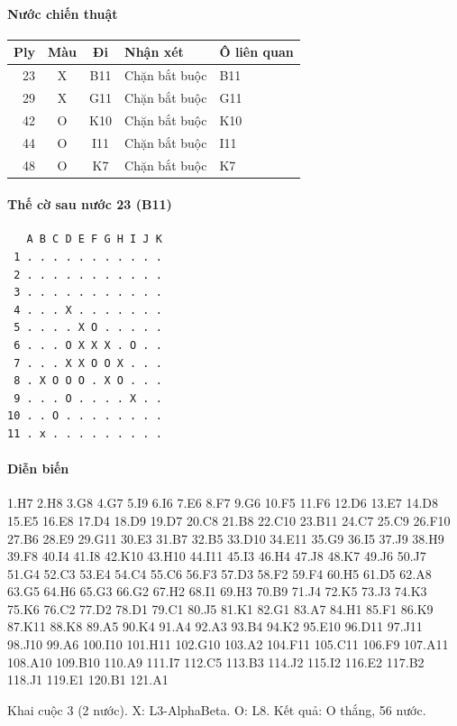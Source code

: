 \paragraph{Nước chiến thuật}
\begin{center}\small
\begin{tabular}{@{}rccll@{}}
\toprule
Ply & Màu & Đi & Nhận xét & Ô liên quan \\
\midrule
23 & X & B11 & Chặn bắt buộc & B11 \\
29 & X & G11 & Chặn bắt buộc & G11 \\
42 & O & K10 & Chặn bắt buộc & K10 \\
44 & O & I11 & Chặn bắt buộc & I11 \\
48 & O & K7 & Chặn bắt buộc & K7 \\
\bottomrule
\end{tabular}
\end{center}
\paragraph{Thế cờ sau nước 23 (B11)}
\begin{verbatim}
   A B C D E F G H I J K
 1 . . . . . . . . . . .
 2 . . . . . . . . . . .
 3 . . . . . . . . . . .
 4 . . . X . . . . . . .
 5 . . . . X O . . . . .
 6 . . . O X X X . O . .
 7 . . . X X O O X . . .
 8 . X O O O . X O . . .
 9 . . . O . . . . X . .
10 . . O . . . . . . . .
11 . x . . . . . . . . .
\end{verbatim}
\paragraph{Diễn biến}
{\footnotesize 1.H7 2.H8 3.G8 4.G7 5.I9 6.I6 7.E6 8.F7 9.G6 10.F5 11.F6 12.D6 13.E7 14.D8 15.E5 16.E8 17.D4 18.D9 19.D7 20.C8 21.B8 22.C10 23.B11 24.C7 25.C9 26.F10 27.B6 28.E9 29.G11 30.E3 31.B7 32.B5 33.D10 34.E11 35.G9 36.I5 37.J9 38.H9 39.F8 40.I4 41.I8 42.K10 43.H10 44.I11 45.I3 46.H4 47.J8 48.K7 49.J6 50.J7 51.G4 52.C3 53.E4 54.C4 55.C6 56.F3 57.D3 58.F2 59.F4 60.H5 61.D5 62.A8 63.G5 64.H6 65.G3 66.G2 67.H2 68.I1 69.H3 70.B9 71.J4 72.K5 73.J3 74.K3 75.K6 76.C2 77.D2 78.D1 79.C1 80.J5 81.K1 82.G1 83.A7 84.H1 85.F1 86.K9 87.K11 88.K8 89.A5 90.K4 91.A4 92.A3 93.B4 94.K2 95.E10 96.D11 97.J11 98.J10 99.A6 100.I10 101.H11 102.G10 103.A2 104.F11 105.C11 106.F9 107.A11 108.A10 109.B10 110.A9 111.I7 112.C5 113.B3 114.J2 115.I2 116.E2 117.B2 118.J1 119.E1 120.B1 121.A1\par}
Khai cuộc 3 (2 nước). X: L3-AlphaBeta. O: L8. Kết quả: O thắng, 56 nước.
